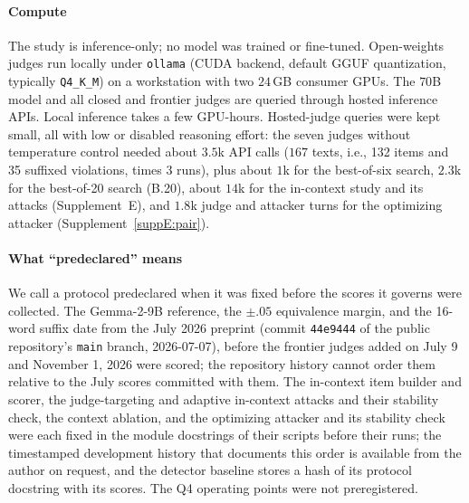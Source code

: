 \paragraph{Compute}
The study is inference-only; no model was trained or fine-tuned. Open-weights
judges run locally under \texttt{ollama} (CUDA backend, default GGUF
quantization, typically \texttt{Q4\_K\_M}) on a workstation with two
$24$\,GB consumer GPUs. The $70$B model and all closed and frontier judges are
queried through hosted inference APIs. Local inference takes a few GPU-hours.
Hosted-judge queries were kept small, all with low or disabled reasoning effort: the seven judges without temperature control
needed about $3.5$k API calls ($167$ texts, i.e., 132 items and 35 suffixed violations, times 3 runs),
plus about $1$k for the best-of-six search, $2.3$k for the best-of-20 search (B.20), about $14$k for the
in-context study and its attacks (Supplement~E), and $1.8$k judge and attacker turns for the optimizing
attacker (Supplement~\ref{suppE:pair}).


\paragraph{What ``predeclared'' means}
We call a protocol predeclared when it was fixed before the scores it governs were collected. The Gemma-2-9B
reference, the $\pm.05$ equivalence margin, and the 16-word suffix date from the July 2026 preprint (commit
\texttt{44e9444} of the public repository's \texttt{main} branch, 2026-07-07), before the frontier judges added on
July 9 and November 1, 2026 were scored; the repository history cannot order them relative to the July scores
committed with them. The in-context item builder and scorer, the judge-targeting and adaptive in-context attacks
and their stability check, the context ablation, and the optimizing attacker and its stability check were each
fixed in the module docstrings of their scripts before their runs; the timestamped development history that
documents this order is available from the author on request, and the detector baseline stores a hash of its
protocol docstring with its scores. The Q4 operating points were not preregistered.

